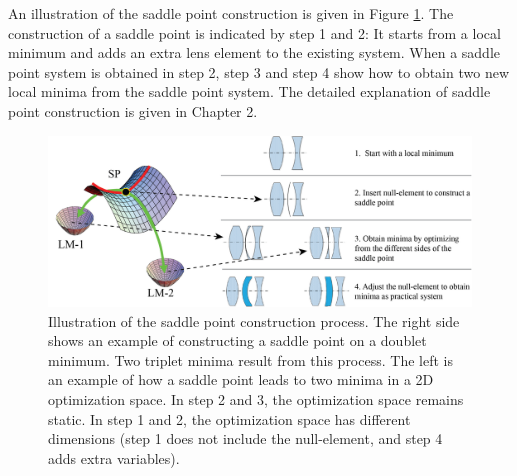 An illustration of the saddle point construction is given in Figure \ref{fig: spc_illustration}. The construction of a saddle point is indicated by step 1 and 2: It starts from a local minimum and adds an extra lens element to the existing system. When a saddle point system is obtained in step 2, step 3 and step 4 show how to obtain two new local minima from the saddle point system. The detailed explanation of saddle point construction is given in Chapter 2. 

\begin{figure}
    \centering
    \includegraphics[scale=0.58]{chapter-1/figures/spc_illustrate.png}
    \caption{Illustration of the saddle point construction process. The right side shows an example of constructing a saddle point on a doublet minimum. Two triplet minima result from this process. The left is an example of how a saddle point leads to two minima in a 2D optimization space. In step 2 and 3, the optimization space remains static. In step 1 and 2, the optimization space has different dimensions (step 1 does not include the null-element, and step 4 adds extra variables). }
    \label{fig: spc_illustration}
\end{figure} 



